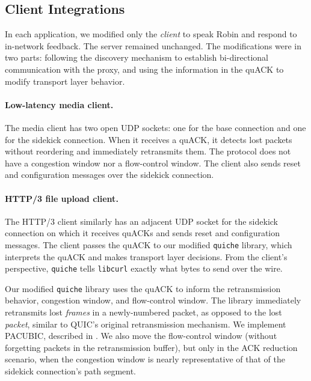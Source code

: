\subsection{Client Integrations}

In each application, we modified only the \emph{client} to speak Robin
and respond to in-network feedback. The server remained unchanged.
The modifications were in two parts: following the discovery mechanism to
establish bi-directional communication with the proxy, and using the information
in the quACK to modify transport layer behavior.



\paragraph{Low-latency media client.} The media client has two open UDP sockets:
one for the base connection and one for the sidekick connection. When it receives a
quACK, it detects lost packets without reordering and immediately retransmits
them. The protocol does not have a congestion window nor a flow-control window.
The client also sends reset and configuration messages over the sidekick connection.

\paragraph{HTTP/3 file upload client.}
The HTTP/3 client similarly has an adjacent UDP socket for the sidekick connection on
which it receives quACKs and sends reset and configuration messages. The client
passes the quACK to our modified \texttt{quiche} library, which interprets the
quACK and makes transport layer decisions. From the client's perspective,
\texttt{quiche} tells \texttt{libcurl} exactly what bytes to send over the wire.

Our modified \texttt{quiche} library uses the quACK to inform the
retransmission behavior, congestion window, and flow-control window. The library
immediately retransmits lost \emph{frames} in a newly-numbered
packet, as opposed to the lost \emph{packet}, similar to QUIC's original
retransmission mechanism. We implement PACUBIC,
described in .
We also move the flow-control window (without forgetting packets in the
retransmission buffer), but only in the ACK reduction scenario, when the
congestion window is nearly representative of that of the sidekick connection's
path segment.

